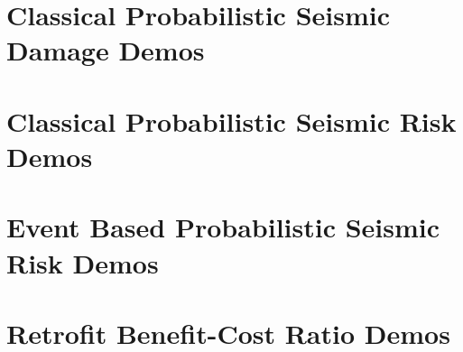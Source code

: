 \section{Classical Probabilistic Seismic Damage Demos}
\label{sec:demos_classical_damage}


\section{Classical Probabilistic Seismic Risk Demos}
\label{sec:demos_classical_risk}


\section{Event Based Probabilistic Seismic Risk Demos}
\label{sec:demos_event_based_risk}


\section{Retrofit Benefit-Cost Ratio Demos}
\label{sec:demos_benefit_cost}
